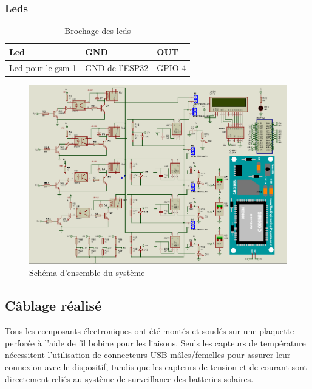 \subsubsection*{Leds}
\begin{table}[H]
	\centering
	\caption{Brochage des leds}
	\begin{tabular}{|p{4.5cm}|p{3.5cm}|p{3.5cm}|}
		\hline
		\rule[0.5cm]{0cm}{0cm} \textbf{Led} & \textbf{GND} & \textbf{OUT} \\
		\hline
		\rule[0.5cm]{0cm}{0cm} Led pour le gsm 1 & GND de l'ESP32  & GPIO 4 \\
		\hline
	\end{tabular}
\end{table}


\begin{landscape}
\begin{figure}[]
	\centering
	\includegraphics[width=25cm]{./img/schema22.PNG}
	\caption{Schéma d'ensemble du système}
	\label{fig:relais_5vdc}
\end{figure}
\end{landscape}

\subsection{Câblage réalisé}
Tous les composants électroniques ont été montés et soudés sur une plaquette perforée à l'aide de fil bobine pour les liaisons. Seuls les capteurs de température nécessitent l'utilisation de connecteurs USB mâles/femelles pour assurer leur connexion avec le dispositif, tandis que les capteurs de tension et de courant sont directement reliés au système de surveillance des batteries solaires.

